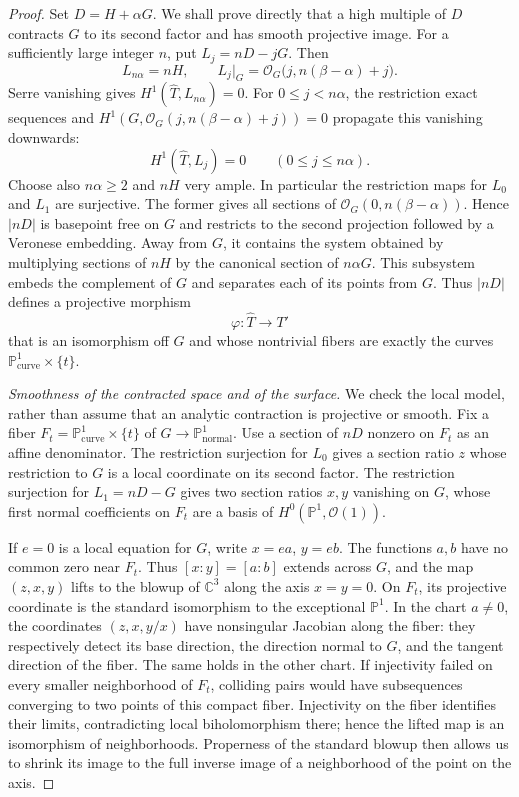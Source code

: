 \documentclass[11pt,reqno]{amsart}
\numberwithin{equation}{section}
\theoremstyle{definition}
\theoremstyle{remark}
\begin{document}
\begin{proof}
Set $D=H+\alpha G$.  We shall prove directly that a high multiple of
$D$ contracts $G$ to its second factor and has smooth projective image.
For a sufficiently large integer $n$, put
$L_j=nD-jG$.  Then
\[
 L_{n\alpha}=nH,
 \qquad L_j|_G=\mathcal O_G\bigl(j,n(\beta-\alpha)+j\bigr).
\]
Serre vanishing gives $H^1(\widehat T,L_{n\alpha})=0$.
For $0\le j<n\alpha$, the restriction exact sequences and
$H^1(G,\mathcal O_G(j,n(\beta-\alpha)+j))=0$ propagate this
vanishing downwards:
\begin{equation}\label{proj:vanishing}
 H^1(\widehat T,L_j)=0\qquad(0\le j\le n\alpha).
\end{equation}
Choose also $n\alpha\ge2$ and $nH$ very ample.  In particular the
restriction maps for $L_0$ and $L_1$ are surjective.  The former gives
all sections of $\mathcal O_G(0,n(\beta-\alpha))$.  Hence $|nD|$ is
basepoint free on $G$ and restricts to the second projection followed
by a Veronese embedding.  Away from $G$, it contains the system
obtained by multiplying sections of $nH$ by the canonical section of
$n\alpha G$.  This subsystem embeds the complement of $G$ and
separates each of its points from $G$.  Thus $|nD|$ defines a projective
morphism
\[
 \varphi:\widehat T\longrightarrow T'
\]
that is an isomorphism off $G$ and whose nontrivial fibers are exactly
the curves $\mathbb P^1_{\mathrm{curve}}\times\{t\}$.

 
 \emph{Smoothness of the contracted space and of the surface.}
We check the local model, rather than assume that an analytic
contraction is projective or smooth.  Fix a fiber
$F_t=\mathbb P^1_{\mathrm{curve}}\times\{t\}$ of $G\to\mathbb P^1_{\mathrm{normal}}$.
Use a section of $nD$ nonzero on $F_t$ as an affine denominator.
The restriction surjection for $L_0$ gives a section ratio $z$ whose
restriction to $G$ is a local coordinate on its second factor.
The restriction surjection for $L_1=nD-G$ gives two section ratios
$x,y$ vanishing on $G$, whose first normal coefficients on $F_t$ are
a basis of $H^0(\mathbb P^1,\mathcal O(1))$.

If $e=0$ is a local equation for $G$, write $x=ea$, $y=eb$.
The functions $a,b$ have no common zero near $F_t$.  Thus
$[x:y]=[a:b]$ extends across $G$, and the map $(z,x,y)$ lifts to the
blowup of $\mathbb C^3$ along the axis $x=y=0$.  On $F_t$, its projective
coordinate is the standard isomorphism to the exceptional $\mathbb P^1$.
In the chart $a\ne0$, the coordinates $(z,x,y/x)$ have nonsingular
Jacobian along the fiber: they respectively detect its base direction,
the direction normal to $G$, and the tangent direction of the fiber.
The same holds in the other chart.  If injectivity failed on every
smaller neighborhood of $F_t$, colliding pairs would have subsequences
converging to two points of this compact fiber.  Injectivity on the fiber
identifies their limits, contradicting local biholomorphism there; hence
the lifted map is an isomorphism of neighborhoods.  Properness of the
standard blowup then allows us to shrink its image to the full inverse
image of a neighborhood of the point on the axis.


\end{proof}
\end{document}

